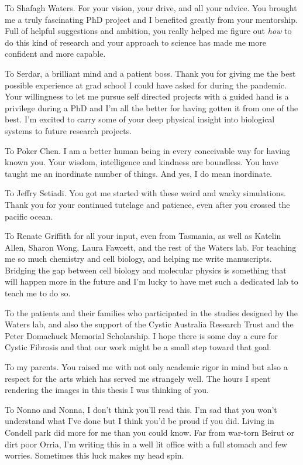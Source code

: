 To Shafagh Waters. For your vision, your drive, and all your advice. You brought me a truly fascinating PhD project and I benefited greatly from your mentorship. Full of helpful suggestions and ambition, you really helped me figure out \textit{how} to do this kind of research and your approach to science has made me more confident and more capable.

To Serdar, a brilliant mind and a patient boss. Thank you for giving me the best possible experience at grad school I could have asked for during the pandemic. Your willingness to let me pursue self directed projects with a guided hand is a privilege during a PhD and I'm all the better for having gotten it from one of the best. I'm excited to carry some of your deep physical insight into biological systems to future research projects. 

To Poker Chen. I am a better human being in every conceivable way for having known you. Your wisdom, intelligence and kindness are boundless. You have taught me an inordinate number of things. And yes, I do mean inordinate.

To Jeffry Setiadi. You got me started with these weird and wacky simulations. Thank you for your continued tutelage and patience, even after you crossed the pacific ocean.

To Renate Griffith for all your input, even from Tasmania, as well as Katelin Allen, Sharon Wong, Laura Fawcett, and the rest of the Waters lab. For teaching me so much chemistry and cell biology, and helping me write manuscripts. Bridging the gap between cell biology and molecular physics is something that will happen more in the future and I'm lucky to have met such a dedicated lab to teach me to do so.

To the patients and their families who participated in the studies designed by the Waters lab, and also the support of the Cystic Australia Research Trust and the Peter Domachuck Memorial Scholarship. I hope there is some day a cure for Cystic Fibrosis and that our work might be a small step toward that goal.

To my parents. You raised me with not only academic rigor in mind but also a respect for the arts which has served me strangely well. The hours I spent rendering the images in this thesis I was thinking of you.

To Nonno and Nonna, I don't think you'll read this. I'm sad that you won't understand what I've done but I think you'd be proud if you did. Living in Condell park did more for me than you could know. Far from war-torn Beirut or dirt poor Orria, I'm writing this in a well lit office with a full stomach and few worries. Sometimes this luck makes my head spin. 

